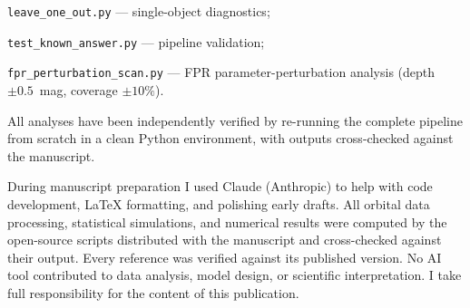\documentclass{aa}
\begin{document}
\noindent\texttt{leave\_one\_out.py} --- single-object diagnostics;

\noindent\texttt{test\_known\_answer.py} --- pipeline validation;

\noindent\texttt{fpr\_perturbation\_scan.py} --- FPR parameter-perturbation analysis (depth $\pm0.5$~mag, coverage $\pm10\%$).

\smallskip
\noindent All analyses have been independently verified by re-running the complete pipeline from scratch in a clean Python environment, with outputs cross-checked against the manuscript.

\begin{acknowledgements}
During manuscript preparation I used Claude (Anthropic) to help with code
development, LaTeX formatting, and polishing early drafts. All orbital
data processing, statistical simulations, and numerical results were
computed by the open-source scripts distributed with the manuscript and
cross-checked against their output. Every reference was verified against
its published version. No AI tool contributed to data analysis, model
design, or scientific interpretation. I take full responsibility for the
content of this publication.
\end{acknowledgements}



\end{document}
